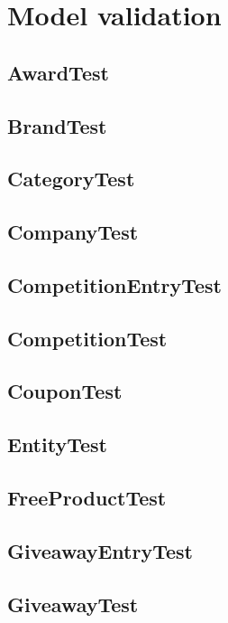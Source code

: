 \documentclass{article}
\begin{document}
\section{Model validation}
\subsection{AwardTest}

\subsection{BrandTest}

\subsection{CategoryTest}

\subsection{CompanyTest}

\subsection{CompetitionEntryTest}

\subsection{CompetitionTest}

\subsection{CouponTest}

\subsection{EntityTest}

\subsection{FreeProductTest}

\subsection{GiveawayEntryTest}

\subsection{GiveawayTest}

\end{document}
